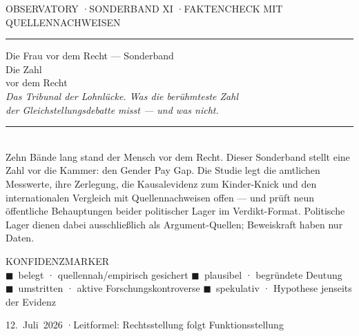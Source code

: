 \documentclass[11pt]{article}
\begin{document}
\begin{titlepage}
\thispagestyle{empty}
\colorbox{obsbg}{%
\begin{minipage}[t][\paperheight][t]{\paperwidth}
\color{obspaper}
\vspace{2.6cm}
\hspace{2.3cm}\begin{minipage}{0.82\textwidth}
{\ttfamily\footnotesize\color{obsaccent}OBSERVATORY \quad·\quad SONDERBAND XI \quad·\quad FAKTENCHECK MIT QUELLENNACHWEISEN}\\[0.3em]
{\color{obsmuted}\rule{\linewidth}{0.4pt}}

\vspace{2.4cm}
{\grotesklight\fontsize{15}{18}\selectfont\color{obsline} Die Frau vor dem Recht --- Sonderband}\\[0.7em]
{\groteskmed\fontsize{40}{46}\selectfont Die Zahl\\[0.15em] vor dem Recht}\\[1.1em]
{\grotesklight\fontsize{16}{22}\selectfont\color{obsline}\itshape
Das Tribunal der Lohnl\"ucke. Was die ber\"uhmteste Zahl\\ der Gleichstellungsdebatte misst --- und was nicht.}

\vspace{2.2cm}
{\color{obsmuted}\rule{\linewidth}{0.4pt}}\\[0.5em]
{\grotesklight\normalsize\color{obsline}
Zehn B\"ande lang stand der Mensch vor dem Recht. Dieser Sonderband stellt eine
Zahl vor die Kammer: den Gender Pay Gap. Die Studie legt die amtlichen Messwerte,
ihre Zerlegung, die Kausalevidenz zum Kinder-Knick und den internationalen
Vergleich mit Quellennachweisen offen --- und pr\"uft neun \"offentliche
Behauptungen beider politischer Lager im Verdikt-Format. Politische Lager dienen
dabei ausschlie\ss lich als Argument-Quellen; Beweiskraft haben nur Daten.}

\vspace{1.6cm}
{\ttfamily\scriptsize\color{obsline}
KONFIDENZMARKER\\[0.5em]
\textcolor{cbelegt}{$\blacksquare$}~belegt · quellennah/empirisch gesichert \qquad
\textcolor{cplausibel}{$\blacksquare$}~plausibel · begr\"undete Deutung\\[0.3em]
\textcolor{cumstritten}{$\blacksquare$}~umstritten · aktive Forschungskontroverse \qquad
\textcolor{cspekulativ}{$\blacksquare$}~spekulativ · Hypothese jenseits der Evidenz}

\vfill
{\ttfamily\footnotesize\color{obsmuted}12.~Juli~2026 \quad·\quad Leitformel: Rechtsstellung folgt Funktionsstellung}
\vspace{2cm}
\end{minipage}
\end{minipage}}
\restoregeometry
\end{titlepage}

\tableofcontents
\thispagestyle{empty}
\clearpage


\end{document}
